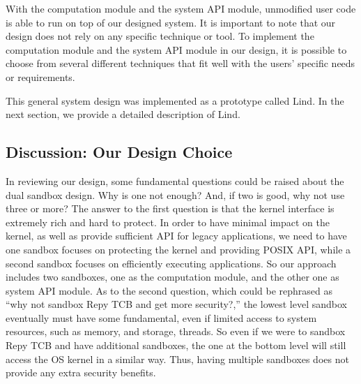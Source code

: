 With the computation module and the system API module, unmodified user code is able to run on top of our designed system. 
It is important to note that our design does not rely on any specific technique or tool. 
To implement the computation module and the system API module in our design, 
it is possible to choose from several different techniques that fit well with the users' specific needs or requirements.

This general system design was implemented as a prototype called Lind. 
In the next section, we provide a detailed description of Lind.

\subsection{Discussion: Our Design Choice}

In reviewing our design, some fundamental questions could be raised about the dual sandbox design. 
Why is one not enough? And, if two is good, why not use three or more? 
The answer to the first question is that the kernel interface is extremely rich and hard to protect. 
In order to have minimal impact on the kernel, as well as provide sufficient API for legacy applications, 
we need to have one sandbox focuses on protecting the kernel and providing POSIX API, 
while a second sandbox focuses on efficiently executing applications. 
So our approach includes two sandboxes, one as the computation module, 
and the other one as system API module. As to the second question, 
which could be rephrased as ``why not sandbox Repy TCB and get more security?,'' 
the lowest level sandbox eventually must have some fundamental, 
even if  limited access to system resources, such as memory, and storage, threads. 
So even if we were to sandbox Repy TCB and have additional sandboxes, 
the one at the bottom level will still access the OS kernel in a similar way. 
Thus, having multiple sandboxes does not provide any extra security benefits. 
